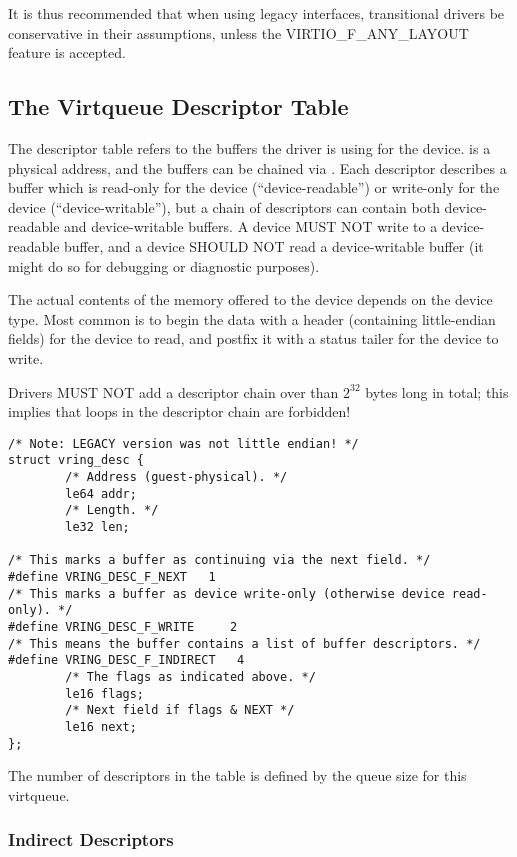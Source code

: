 It is thus recommended that when using legacy interfaces, transitional
drivers be conservative in their assumptions, unless the
VIRTIO_F_ANY_LAYOUT feature is accepted.

\subsection{The Virtqueue Descriptor Table}\label{sec:Basic Facilities of a Virtio Device / Virtqueues / The Virtqueue Descriptor Table}

The descriptor table refers to the buffers the driver is using for
the device.  is a physical address, and the buffers
can be chained via . Each descriptor describes a
buffer which is read-only for the device (``device-readable'') or write-only for the device (``device-writable''), but a chain of
descriptors can contain both device-readable and device-writable buffers.
A device MUST NOT write to a device-readable buffer, and a device SHOULD NOT
read a device-writable buffer (it might do so for debugging or diagnostic
purposes).

The actual contents of the memory offered to the device depends on the
device type.  Most common is to begin the data with a header
(containing little-endian fields) for the device to read, and postfix
it with a status tailer for the device to write.

Drivers MUST NOT add a descriptor chain over than $2^{32}$ bytes long in total;
this implies that loops in the descriptor chain are forbidden!

\begin{lstlisting}
/* Note: LEGACY version was not little endian! */
struct vring_desc {
        /* Address (guest-physical). */
        le64 addr;
        /* Length. */
        le32 len;

/* This marks a buffer as continuing via the next field. */
#define VRING_DESC_F_NEXT   1
/* This marks a buffer as device write-only (otherwise device read-only). */
#define VRING_DESC_F_WRITE     2
/* This means the buffer contains a list of buffer descriptors. */
#define VRING_DESC_F_INDIRECT   4
        /* The flags as indicated above. */
        le16 flags;
        /* Next field if flags & NEXT */
        le16 next;
};
\end{lstlisting}

The number of descriptors in the table is defined by the queue size
for this virtqueue.

\subsubsection{Indirect Descriptors}\label{sec:Basic Facilities of a Virtio Device / Virtqueues / The Virtqueue Descriptor Table / Indirect Descriptors}

